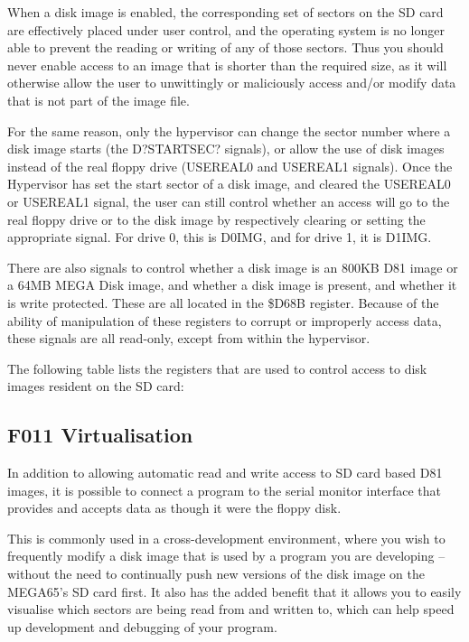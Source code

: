 When a disk image is enabled, the corresponding set of sectors on the
SD card are effectively placed under user control, and the operating
system is no longer able to prevent the reading or writing of any of
those sectors.  Thus you should never enable access to an image that
is shorter than the required size, as it will otherwise allow the user
to unwittingly or maliciously access and/or modify data that is not
part of the image file.

For the same reason, only the hypervisor can change the sector number
where a disk image starts (the D?STARTSEC? signals), or allow the use
of disk images instead of the real floppy drive (USEREAL0 and USEREAL1
signals).  Once the Hypervisor has set the start sector of a disk
image, and cleared the USEREAL0 or USEREAL1 signal, the user can still
control whether an access will go to the real floppy drive or to the
disk image by respectively clearing or setting the appropriate
signal.  For drive 0, this is D0IMG, and for drive 1, it is D1IMG.

There are also signals to control whether a disk image is an 800KB
D81 image or a 64MB MEGA Disk image, and whether a disk image is
present, and whether it is write protected. These are all located in
the \$D68B register. Because of the ability of manipulation of these
registers to corrupt or improperly access data, these signals are all
read-only, except from within the hypervisor.

The following table lists the registers that are used to control
access to disk images resident on the SD card:



\subsection{F011 Virtualisation}

In addition to allowing automatic read and write access to SD card
based D81 images, it is possible to connect a program to the serial
monitor interface that provides and accepts data as though it were the
floppy disk.

This is commonly used in a cross-development
environment, where you wish to frequently modify a disk image that is
used by a program you are developing -- without the need to
continually push new versions of the disk image on the MEGA65's
SD card first. It also has the added benefit that it allows you to
easily visualise which sectors are being read from and written to,
which can help speed up development and debugging of your program.

